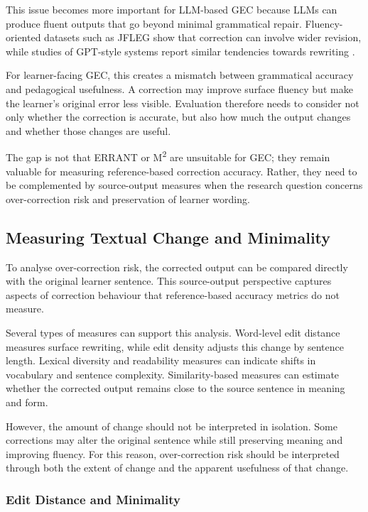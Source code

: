 This issue becomes more important for LLM-based GEC because LLMs can produce fluent outputs that go beyond minimal grammatical repair. Fluency-oriented datasets such as JFLEG \cite{napoles-etal-2017-jfleg} show that correction can involve wider revision, while studies of GPT-style systems report similar tendencies towards rewriting \cite{loem2023exploringeffectivenessgpt3grammatical}.

For learner-facing GEC, this creates a mismatch between grammatical accuracy and pedagogical usefulness. A correction may improve surface fluency but make the learner's original error less visible. Evaluation therefore needs to consider not only whether the correction is accurate, but also how much the output changes and whether those changes are useful.

The gap is not that ERRANT or M\textsuperscript{2} are unsuitable for GEC; they remain valuable for measuring reference-based correction accuracy. Rather, they need to be complemented by source-output measures when the research question concerns over-correction risk and preservation of learner wording.

\subsection{Measuring Textual Change and Minimality}

To analyse over-correction risk, the corrected output can be compared directly with the original learner sentence. This source-output perspective captures aspects of correction behaviour that reference-based accuracy metrics do not measure.

Several types of measures can support this analysis. Word-level edit distance measures surface rewriting, while edit density adjusts this change by sentence length. Lexical diversity and readability measures can indicate shifts in vocabulary and sentence complexity. Similarity-based measures can estimate whether the corrected output remains close to the source sentence in meaning and form.

However, the amount of change should not be interpreted in isolation. Some corrections may alter the original sentence while still preserving meaning and improving fluency. For this reason, over-correction risk should be interpreted through both the extent of change and the apparent usefulness of that change.

\subsubsection{Edit Distance and Minimality}

